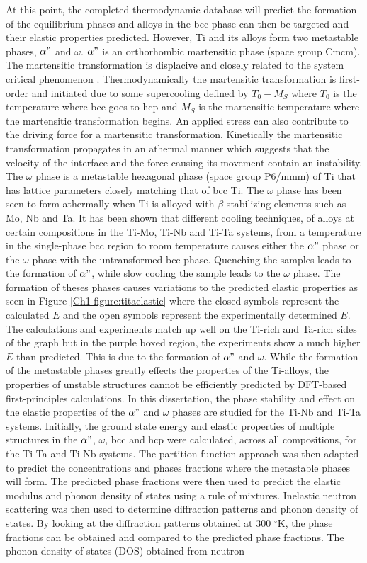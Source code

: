 At this point, the completed thermodynamic database will predict the formation of the equilibrium phases and alloys in the bcc phase can then be targeted and their elastic properties predicted. However, Ti and its alloys form two metastable phases, $\alpha"$ and $\omega$. $\alpha"$ is an orthorhombic martensitic phase (space group Cmcm). The martensitic transformation is displacive and closely related to the system critical phenomenon \cite{Khachaturyan1985,Salje1990}. Thermodynamically the martensitic transformation is first-order and initiated due to some supercooling defined by $T_{0}-M_{S}$ where $T_{0}$ is the temperature where bcc goes to hcp and $M_{S}$ is the martensitic temperature where the martensitic transformation begins. An applied stress can also contribute to the driving force for a martensitic transformation. Kinetically the martensitic transformation propagates in an athermal manner which suggests that the velocity of the interface and the force causing its movement contain an instability. The $\omega$ phase is a metastable hexagonal phase (space group P6/mmm) of Ti that has lattice parameters closely matching that of bcc Ti. The $\omega$ phase has been seen to form athermally when Ti is alloyed with $\beta$ stabilizing elements such as Mo, Nb and Ta. It has been shown that different cooling techniques, of alloys at certain compositions in the Ti-Mo, Ti-Nb and Ti-Ta systems, from a temperature in the single-phase bcc region to room temperature causes either the $\alpha"$ phase or the $\omega$ phase with the untransformed bcc phase. Quenching the samples leads to the formation of $\alpha"$, while slow cooling the sample leads to the $\omega$ phase. The formation of theses phases causes variations to the predicted elastic properties as seen in Figure \ref{Ch1-figure:titaelastic} where the closed symbols represent the calculated $E$ and the open symbols represent the experimentally determined $E$. The calculations and experiments match up well on the Ti-rich and Ta-rich sides of the graph but in the purple boxed region, the experiments show a much higher $E$ than predicted. This is due to the formation of $\alpha"$ and $\omega$. While the formation of the metastable phases greatly effects the properties of the Ti-alloys, the properties of unstable structures cannot be efficiently predicted by DFT-based first-principles calculations. In this dissertation, the phase stability and effect on the elastic properties of the $\alpha"$ and $\omega$ phases are studied for the Ti-Nb and Ti-Ta systems. Initially, the ground state energy and elastic properties of multiple structures in the $\alpha"$, $\omega$, bcc and hcp were calculated, across all compositions, for the Ti-Ta and Ti-Nb systems. The partition function approach was then adapted to predict the concentrations and phases fractions where the metastable phases will form. The predicted phase fractions were then used to predict the elastic modulus and phonon density of states using a rule of mixtures. Inelastic neutron scattering was then used to determine diffraction patterns and phonon density of states. By looking at the diffraction patterns obtained at 300 $^\circ$K, the phase fractions can be obtained and compared to the predicted phase fractions. The phonon density of states (DOS) obtained from neutron 